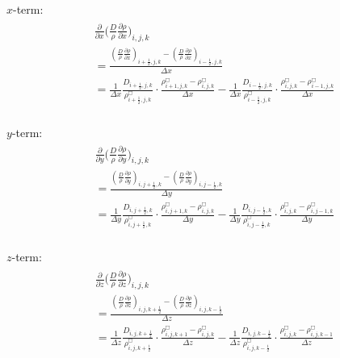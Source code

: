 \documentclass{article}
\numberwithin{equation}{subsection}
\begin{document}
$x$-term:
\begin{align}
\begin{split}
& \frac{\partial}{\partial x} \Big( \frac{D}{\rho}\frac{\partial \rho}{\partial x} \Big)_{i,j,k} \\
&= \frac{ (\frac{D}{\rho}\frac{\partial \rho}{\partial x})_{i+\frac{1}{2},j,k} - (\frac{D}{\rho}\frac{\partial \rho}{\partial x})_{i-\frac{1}{2},j,k} }{\Delta x} \\
& = \frac{1}{\Delta x}\frac{D_{i+\frac{1}{2},j,k}}{\rho^{\Box}_{i+\frac{1}{2},j,k}}\cdot \frac{\rho^{\Box}_{i+1,j,k} - \rho^{\Box}_{i,j,k}}{\Delta x}
- \frac{1}{\Delta x}\frac{D_{i-\frac{1}{2},j,k}}{\rho^{\Box}_{i-\frac{1}{2},j,k}}\cdot \frac{\rho^{\Box}_{i,j,k} - \rho^{\Box}_{i-1,j,k}}{\Delta x}\\
\end{split}
\end{align}


$y$-term:
\begin{align}
\begin{split}
& \frac{\partial}{\partial y} \Big( \frac{D}{\rho}\frac{\partial \rho}{\partial y} \Big)_{i,j,k} \\
&= \frac{ (\frac{D}{\rho}\frac{\partial \rho}{\partial y})_{i,j+\frac{1}{2},k} - (\frac{D}{\rho}\frac{\partial \rho}{\partial y})_{i,j-\frac{1}{2},k} }{\Delta y} \\
& = \frac{1}{\Delta y}\frac{D_{i,j+\frac{1}{2},k}}{\rho^{\Box}_{i,j+\frac{1}{2},k}}\cdot \frac{\rho^{\Box}_{i,j+1,k} - \rho^{\Box}_{i,j,k}}{\Delta y}
- \frac{1}{\Delta y}\frac{D_{i,j-\frac{1}{2},k}}{\rho^{\Box}_{i,j-\frac{1}{2},k}}\cdot \frac{\rho^{\Box}_{i,j,k} - \rho^{\Box}_{i,j-1,k}}{\Delta y}\\
\end{split}
\end{align}


$z$-term:
\begin{align}
\begin{split}
& \frac{\partial}{\partial z} \Big( \frac{D}{\rho}\frac{\partial \rho}{\partial z} \Big)_{i,j,k} \\
&= \frac{ (\frac{D}{\rho}\frac{\partial \rho}{\partial z})_{i,j,k+\frac{1}{2}} - (\frac{D}{\rho}\frac{\partial \rho}{\partial z})_{i,j,k-\frac{1}{2}} }{\Delta z} \\
& = \frac{1}{\Delta z}\frac{D_{i,j,k+\frac{1}{2}}}{\rho^{\Box}_{i,j,k+\frac{1}{2}}}\cdot \frac{\rho^{\Box}_{i,j,k+1} - \rho^{\Box}_{i,j,k}}{\Delta z}
    - \frac{1}{\Delta z}\frac{D_{i,j,k-\frac{1}{2}}}{\rho^{\Box}_{i,j,k-\frac{1}{2}}}\cdot \frac{\rho^{\Box}_{i,j,k} - \rho^{\Box}_{i,j,k-1}}{\Delta z}\\
\end{split}
\end{align}
\end{document}
